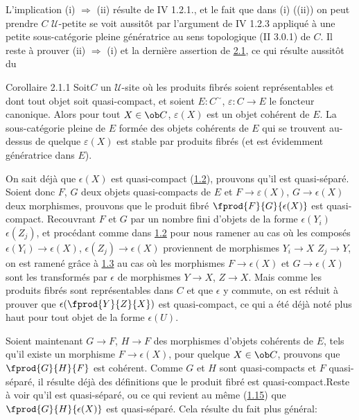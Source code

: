 L'implication (i) $\Rightarrow$ (ii) résulte de IV 1.2.1., et le
fait que dans (i) (\resp (ii)) on peut prendre $C$ $𝒰$-petite se voit
aussitôt par l'argument de IV 1.2.3 appliqué à une petite
sous-catégorie pleine génératrice au sens topologique (II 3.0.1) de
$C$. Il reste à prouver (ii) $\Rightarrow$ (i) et la dernière
assertion de \hyperref[VI.prop2.1]{2.1}, ce qui résulte aussitôt du

\begin{enonce*}{Corollaire 2.1.1}
Soit\pageoriginale $C$ un $𝒰$-site où les produits fibrés soient
représentables et dont tout objet soit quasi-compact, et soient $E : C^{\sim}$,
$\varepsilon : C \to E$ le foncteur canonique. Alors pour tout $X \in
\ob C$, $\varepsilon(X)$ est un objet cohérent de $E$. La
sous-catégorie pleine de $E$ formée des objets cohérents de $E$ qui se
trouvent au-dessus de quelque $\varepsilon(X)$ est stable par produits
fibrés (et est évidemment génératrice dans $E$).
\end{enonce*}

On sait déjà que $\epsilon(X)$ est quasi-compact (\hyperref[VI.prop1.2]{1.2}),
prouvons qu'il est quasi-séparé. Soient donc $F$, $G$ deux objets
quasi-compacts de $E$ et $F \to \varepsilon(X)$, $G \to \epsilon(X)$
deux morphismes, prouvons que le produit fibré
$\fprod{F}{G}{\epsilon(X)}$ est quasi-compact. Recouvrant $F$ et $G$
par un nombre fini d'objets de la forme $\epsilon(Y_i)$ \resp
$\epsilon(Z_j)$, et procédant comme dans \hyperref[VI.prop1.2]{1.2} pour nous
ramener au cas où les composés $\epsilon(Y_i) \to \epsilon(X)$,
$\epsilon(Z_j) \to \epsilon(X)$ proviennent de morphismes $Y_i \to
X$ \resp $Z_j \to Y$, on est ramené grâce à \hyperref[VI.prop1.3]{1.3} au cas
où les morphismes $F \to \epsilon(X)$ et $G \to \epsilon(X)$
sont les transformés par $\epsilon$ de morphismes $Y \to X$, $Z \to
X$. Mais comme les produits fibrés sont représentables dans $C$ et
que $\epsilon$ y commute, on est réduit à prouver que
$\epsilon(\fprod{Y}{Z}{X})$ est quasi-compact, ce qui a été déjà
noté plus haut pour tout objet de la forme $\epsilon(U)$.

Soient maintenant $G \to F$, $H \to F$ des morphismes d'objets
cohérents de $E$, tels qu'il existe un morphisme $F \to
\epsilon(X)$, pour quelque $X \in \ob C$, prouvons que
$\fprod{G}{H}{F}$ est cohérent. Comme $G$ et $H$ sont quasi-compacts
et $F$ quasi-séparé, il résulte déjà des définitions que le produit
fibré est quasi-compact.\pageoriginale Reste à voir qu'il est
quasi-séparé, ou ce qui revient au même (\hyperref[VI.cor1.15]{1.15}) que $\fprod{G}{H}{\epsilon(X)}$ est
quasi-séparé. Cela résulte du fait plus général:

